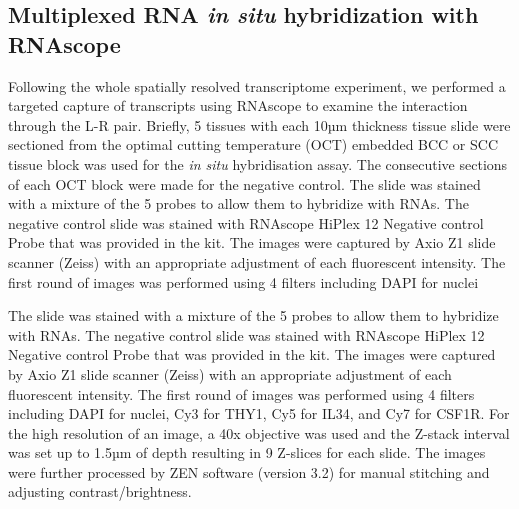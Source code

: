 \subsection{Multiplexed RNA \textit{in situ} hybridization with RNAscope}
Following the whole spatially resolved transcriptome experiment, we performed a targeted capture of transcripts using RNAscope to examine the interaction through the L-R pair. Briefly, 5 tissues with each 10µm thickness tissue slide were sectioned from the optimal cutting temperature (OCT) embedded BCC or SCC tissue block was used for the \textit{in situ} hybridisation assay. The consecutive sections of each OCT block were made for the negative control. The slide was stained with a mixture of the 5 probes to allow them to hybridize with RNAs. The negative control slide was stained with RNAscope HiPlex 12 Negative control Probe that was provided in the kit. The images were captured by Axio Z1 slide scanner (Zeiss) with an appropriate adjustment of each fluorescent intensity. The first round of images was performed using 4 filters including DAPI for nuclei

The slide was stained with a mixture of the 5 probes to allow them to hybridize with RNAs. The negative control slide was stained with RNAscope HiPlex 12 Negative control Probe that was provided in the kit. The images were captured by Axio Z1 slide scanner (Zeiss) with an appropriate adjustment of each fluorescent intensity. The first round of images was performed using 4 filters including DAPI for nuclei, Cy3 for THY1, Cy5 for IL34, and Cy7 for CSF1R. For the high resolution of an image, a 40x objective was used and the Z-stack interval was set up to 1.5µm of depth resulting in 9 Z-slices for each slide. The images were further processed by ZEN software (version 3.2) for manual stitching and adjusting contrast/brightness.

